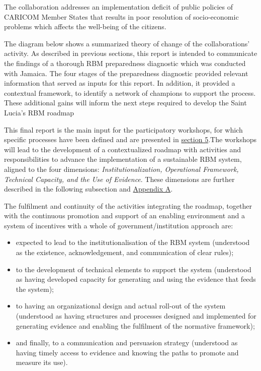 \documentclass[
  10pt,
]{book}
\begin{document}
The collaboration addresses an implementation deficit of public policies of CARICOM Member States that results in poor resolution of socio-economic problems which affects the well-being of the citizens.

The diagram below shows a summarized theory of change of the collaborations' activity. As described in previous sections, this report is intended to communicate the findings of a thorough RBM preparedness diagnostic which was conducted with Jamaica. The four stages of the preparedness diagnostic provided relevant information that served as inputs for this report. In addition, it provided a contextual framework, to identify a network of champions to support the process. These additional gains will inform the next steps required to develop the Saint Lucia's RBM roadmap

This final report is the main input for the participatory workshops, for which specific processes have been defined and are presented in \protect\hyperlink{section5}{section 5}.The workshops will lead to the development of a contextualized roadmap with activities and responsibilities to advance the implementation of a sustainable RBM system, aligned to the four dimensions: \emph{Institutionalization, Operational Framework, Technical Capacity, and the Use of Evidence}. These dimensions are further described in the following subsection and \protect\hyperlink{appendixA}{Appendix A}.

The fulfilment and continuity of the activities integrating the roadmap, together with the continuous promotion and support of an enabling environment and a system of incentives with a whole of government/institution approach are:

\begin{itemize}
\item
  expected to lead to the institutionalisation of the RBM system (understood as the existence, acknowledgement, and communication of clear rules);
\item
  to the development of technical elements to support the system (understood as having developed capacity for generating and using the evidence that feeds the system);
\item
  to having an organizational design and actual roll-out of the system (understood as having structures and processes designed and implemented for generating evidence and enabling the fulfilment of the normative framework);
\item
  and finally, to a communication and persuasion strategy (understood as having timely access to evidence and knowing the paths to promote and measure its use).
\end{itemize}
\end{document}
